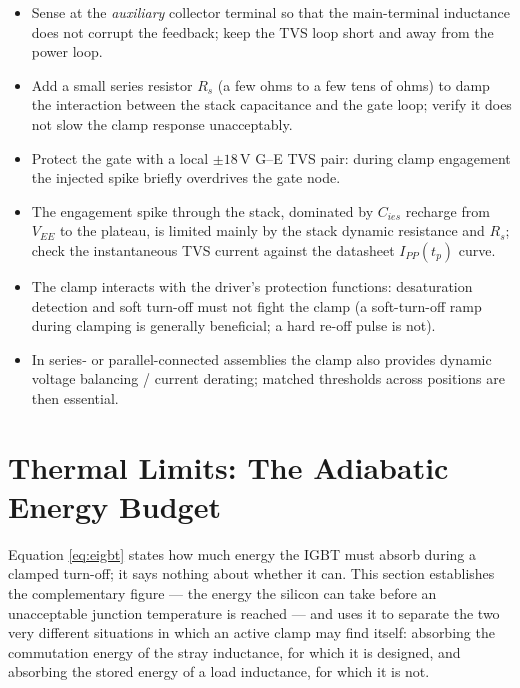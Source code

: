 \documentclass[11pt,a4paper]{article}
\begin{document}
\begin{itemize}
  \item Sense at the \emph{auxiliary} collector terminal so that the
        main-terminal inductance does not corrupt the feedback; keep
        the TVS loop short and away from the power loop.
  \item Add a small series resistor $R_s$ (a few ohms to a few tens of
        ohms) to damp the interaction between the stack capacitance and
        the gate loop; verify it does not slow the clamp response
        unacceptably.
  \item Protect the gate with a local $\pm18$\,V G--E TVS pair: during
        clamp engagement the injected spike briefly overdrives the
        gate node.
  \item The engagement spike through the stack, dominated by
        $C_{ies}$ recharge from $V_{EE}$ to the plateau, is limited
        mainly by the stack dynamic resistance and $R_s$; check the
        instantaneous TVS current against the datasheet
        $I_{PP}(t_p)$ curve.
  \item The clamp interacts with the driver's protection functions:
        desaturation detection and soft turn-off must not fight the
        clamp (a soft-turn-off ramp during clamping is generally
        beneficial; a hard re-off pulse is not).
  \item In series- or parallel-connected assemblies the clamp also
        provides dynamic voltage balancing / current derating; matched
        thresholds across positions are then essential.
\end{itemize}

\section{Thermal Limits: The Adiabatic Energy Budget}
\label{sec:adiabatic}

Equation \eqref{eq:eigbt} states how much energy the IGBT must absorb
during a clamped turn-off; it says nothing about whether it can. This
section establishes the complementary figure --- the energy the silicon
can take before an unacceptable junction temperature is reached --- and
uses it to separate the two very different situations in which an active
clamp may find itself: absorbing the commutation energy of the stray
inductance, for which it is designed, and absorbing the stored energy of
a load inductance, for which it is not.
\end{document}
